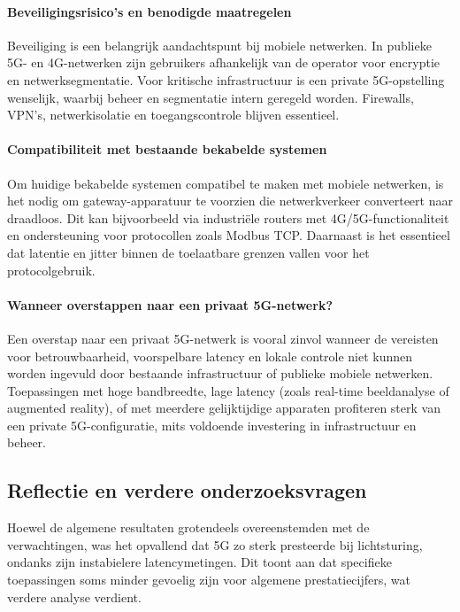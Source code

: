 \paragraph{Beveiligingsrisico's en benodigde maatregelen}Beveiliging is een belangrijk aandachtspunt bij mobiele netwerken. In publieke 5G- en 4G-netwerken zijn gebruikers afhankelijk van de operator voor encryptie en netwerksegmentatie. Voor kritische infrastructuur is een private 5G-opstelling wenselijk, waarbij beheer en segmentatie intern geregeld worden. Firewalls, VPN's, netwerkisolatie en toegangscontrole blijven essentieel.

\paragraph{Compatibiliteit met bestaande bekabelde systemen}Om huidige bekabelde systemen compatibel te maken met mobiele netwerken, is het nodig om gateway-apparatuur te voorzien die netwerkverkeer converteert naar draadloos. Dit kan bijvoorbeeld via industriële routers met 4G/5G-functionaliteit en ondersteuning voor protocollen zoals Modbus TCP. Daarnaast is het essentieel dat latentie en jitter binnen de toelaatbare grenzen vallen voor het protocolgebruik.

\paragraph{Wanneer overstappen naar een privaat 5G-netwerk?}Een overstap naar een privaat 5G-netwerk is vooral zinvol wanneer de vereisten voor betrouwbaarheid, voorspelbare latency en lokale controle niet kunnen worden ingevuld door bestaande infrastructuur of publieke mobiele netwerken. Toepassingen met hoge bandbreedte, lage latency (zoals real-time beeldanalyse of augmented reality), of met meerdere gelijktijdige apparaten profiteren sterk van een private 5G-configuratie, mits voldoende investering in infrastructuur en beheer.

\subsection{Reflectie en verdere onderzoeksvragen}

Hoewel de algemene resultaten grotendeels overeenstemden met de verwachtingen, was het opvallend dat 5G zo sterk presteerde bij lichtsturing, ondanks zijn instabielere latencymetingen. Dit toont aan dat specifieke toepassingen soms minder gevoelig zijn voor algemene prestatiecijfers, wat verdere analyse verdient.

